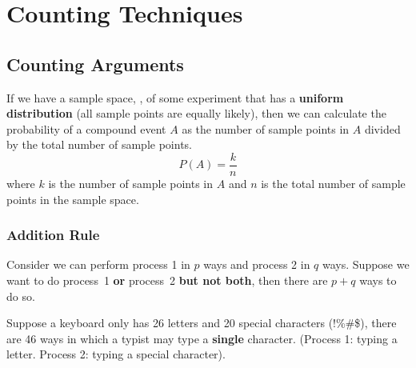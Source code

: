 \chapter{Counting Techniques}
\section{Counting Arguments}
If we have a sample space, \sS, of some experiment that has a \textbf{uniform distribution} (all sample points are equally likely), then we can calculate the probability of a compound event $A$ as the number of sample points in $A$ divided by the total number of sample points.
\[
    P(A) = \frac{k}{n}
\]
where $k$ is the number of sample points in $A$ and $n$ is the total number of sample points in the sample space.
\subsection*{Addition Rule}
Consider we can perform process 1 in $p$ ways and process 2 in $q$ ways. Suppose we want to do process~1 \textbf{or} process~2 \textbf{but not both}, then there are $p + q$ ways to do so.
\begin{example}
Suppose a keyboard only has 26 letters and 20 special characters (!\%\#\$), there are 46 ways in which a typist may type a \textbf{single} character. (Process 1: typing a letter. Process 2: typing a special character).
\end{example}
